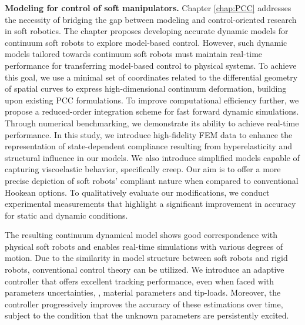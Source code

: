 

\textbf{Modeling for control of soft manipulators.} Chapter \ref{chap:PCC} addresses the necessity of bridging the gap between modeling and control-oriented research in soft robotics. The chapter proposes developing accurate dynamic models for continuum soft robots to explore model-based control. However, such dynamic models tailored towards continuum soft robots must maintain real-time performance for transferring model-based control to physical systems. To achieve this goal, we use a minimal set of coordinates related to the differential geometry of spatial curves to express high-dimensional continuum deformation, building upon existing PCC formulations. To improve computational efficiency further, we propose a reduced-order integration scheme for fast forward dynamic simulations. Through numerical benchmarking, we demonstrate its ability to achieve real-time performance. In this study, we introduce high-fidelity FEM data to enhance the representation of state-dependent compliance resulting from hyperelasticity and structural influence in our models. We also introduce simplified models capable of capturing viscoelastic behavior, specifically creep. Our aim is to offer a more precise depiction of soft robots' compliant nature when compared to conventional Hookean options. To qualitatively evaluate our modifications, we conduct experimental measurements that highlight a significant improvement in accuracy for static and dynamic conditions.

The resulting continuum dynamical model shows good correspondence with physical soft robots and enables real-time simulations with various degrees of motion. Due to the similarity in model structure between soft robots and rigid robots, conventional control theory can be utilized. We introduce an adaptive controller that offers excellent tracking performance, even when faced with parameters uncertainties, \eg, material parameters and tip-loads. Moreover, the controller progressively improves the accuracy of these estimations over time, subject to the condition that the unknown parameters are persistently excited. 

